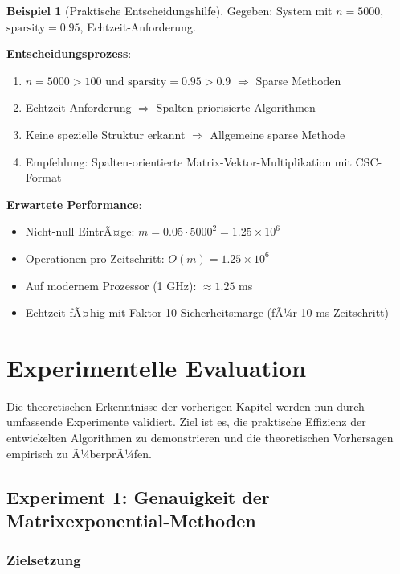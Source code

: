 ﻿\documentclass[a4paper,12pt]{report}
\theoremstyle{definition}
\newtheorem{beispiel}{Beispiel}
\begin{document}
	\begin{beispiel}[Praktische Entscheidungshilfe]
		Gegeben: System mit $n = 5000$, $\text{sparsity} = 0.95$, Echtzeit-Anforderung.
		
		\textbf{Entscheidungsprozess}:
		\begin{enumerate}
			\item $n = 5000 > 100$ und $\text{sparsity} = 0.95 > 0.9$ $\Rightarrow$ Sparse Methoden
			\item Echtzeit-Anforderung $\Rightarrow$ Spalten-priorisierte Algorithmen
			\item Keine spezielle Struktur erkannt $\Rightarrow$ Allgemeine sparse Methode
			\item Empfehlung: Spalten-orientierte Matrix-Vektor-Multiplikation mit CSC-Format
		\end{enumerate}
		
		\textbf{Erwartete Performance}:
		\begin{itemize}
			\item Nicht-null EintrÃ¤ge: $m = 0.05 \cdot 5000^2 = 1.25 \times 10^6$
			\item Operationen pro Zeitschritt: $O(m) = 1.25 \times 10^6$
			\item Auf modernem Prozessor (1 GHz): $\approx 1.25$ ms
			\item Echtzeit-fÃ¤hig mit Faktor 10 Sicherheitsmarge (fÃ¼r 10 ms Zeitschritt)
		\end{itemize}
	\end{beispiel}
	
	\chapter{Experimentelle Evaluation}
	
	Die theoretischen Erkenntnisse der vorherigen Kapitel werden nun durch umfassende Experimente validiert. Ziel ist es, die praktische Effizienz der entwickelten Algorithmen zu demonstrieren und die theoretischen Vorhersagen empirisch zu Ã¼berprÃ¼fen.
	
	\section{Experiment 1: Genauigkeit der Matrixexponential-Metho\-den}
	
	\subsection{Zielsetzung}
	
\end{document}
